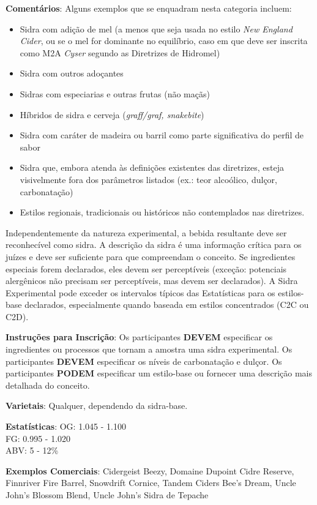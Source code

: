 \textbf{Comentários}: Alguns exemplos que se enquadram nesta categoria incluem:
\begin{itemize}[leftmargin=3mm]
\item Sidra com adição de mel (a menos que seja usada no estilo \textit{New England Cider}, ou se o mel for dominante no equilíbrio, caso em que deve ser inscrita como M2A \textit{Cyser} segundo as Diretrizes de Hidromel)
\item Sidra com outros adoçantes
\item Sidras com especiarias e outras frutas (não maçãs)
\item Híbridos de sidra e cerveja (\textit{graff/graf, snakebite})
\item Sidra com caráter de madeira ou barril como parte significativa do perfil de sabor
\item Sidra que, embora atenda às definições existentes das diretrizes, esteja visivelmente fora dos parâmetros listados (ex.: teor alcoólico, dulçor, carbonatação)
\item Estilos regionais, tradicionais ou históricos não contemplados nas diretrizes.
\end{itemize}
Independentemente da natureza experimental, a bebida resultante deve ser reconhecível como sidra. A descrição da sidra é uma informação crítica para os juízes e deve ser suficiente para que compreendam o conceito. Se ingredientes especiais forem declarados, eles devem ser perceptíveis (exceção: potenciais alergênicos não precisam ser perceptíveis, mas devem ser declarados).  
A Sidra Experimental pode exceder os intervalos típicos das Estatísticas para os estilos-base declarados, especialmente quando baseada em estilos concentrados (C2C ou C2D).

\textbf{Instruções para Inscrição}: Os participantes \textbf{DEVEM} especificar os ingredientes ou processos que tornam a amostra uma sidra experimental. Os participantes \textbf{DEVEM} especificar os níveis de carbonatação e dulçor. Os participantes \textbf{PODEM} especificar um estilo-base ou fornecer uma descrição mais detalhada do conceito.

\textbf{Varietais}: Qualquer, dependendo da sidra-base.

\textbf{Estatísticas}: OG: 1.045 - 1.100 \\
\phantom{ } \hspace{16.5mm} FG: 0.995 - 1.020 \\
\phantom{ } \hspace{16.5mm} ABV: 5 - 12\%

\textbf{Exemplos Comerciais}: Cidergeist Beezy, Domaine Dupoint Cidre Reserve, Finnriver Fire Barrel, Snowdrift Cornice, Tandem Ciders Bee's Dream, Uncle John's Blossom Blend, Uncle John's Sidra de Tepache